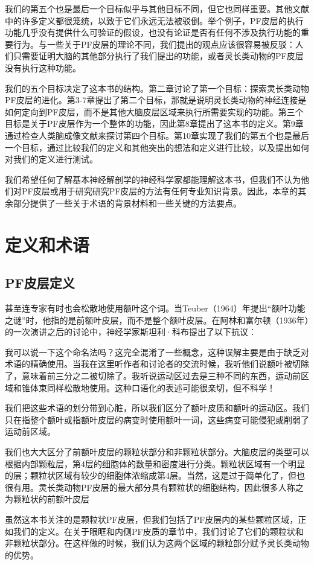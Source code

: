 我们的第五个也是最后一个目标似乎与其他目标不同，但它也同样重要。其他文献中的许多定义都很笼统，以致于它们永远无法被驳倒。举个例子，PF皮层的执行功能几乎没有提供什么可验证的假设，也没有论证是否有任何不涉及执行功能的重要行为。与一些关于PF皮层的理论不同，我们提出的观点应该很容易被反驳：人们只需要证明大脑的其他部分执行了我们提出的功能，或者灵长类动物的PF皮层没有执行这种功能。
\par
我们的五个目标决定了这本书的结构。第二章讨论了第一个目标：探索灵长类动物PF皮层的进化。第3-7章提出了第二个目标，那就是说明灵长类动物的神经连接是如何定向到PF皮层，而不是其他大脑皮层区域来执行所需要实现的功能。第三个目标是关于PF皮层作为一个整体的功能，因此第8章提出了这本书的定义。第9章通过检查人类脑成像文献来探讨第四个目标。第10章实现了我们的第五个也是最后一个目标，通过比较我们的定义和其他突出的想法和定义进行比较，以及提出如何对我们的定义进行测试。
\par
我们希望任何了解基本神经解剖学的神经科学家都能理解这本书，但我们不认为他们对PF皮层或用于研究研究PF皮层的方法有任何专业知识背景。因此，本章的其余部分提供了一些关于术语的背景材料和一些关键的方法要点。



\section{定义和术语}
\subsection{PF皮层定义}
甚至连专家有时也会松散地使用额叶这个词。当Teuber（1964）年提出“额叶功能之谜”时，他指的是前额叶皮层，而不是整个额叶皮层。在阿林和富尔顿（1936年）的一次演讲之后的讨论中，神经学家斯坦利·科布提出了以下抗议：
\par
我可以说一下这个命名法吗？这完全混淆了一些概念，这种误解主要是由于缺乏对术语的精确使用。当我在这里听作者和讨论者的交流时候，我听他们说额叶被切除了，意味着前三分之二被切除了。我听说运动区过去是三种不同的东西，运动前区域和锥体束同样松散地使用。这种口语化的表述可能很亲切，但不科学！
\par
我们把这些术语的划分带到心脏，所以我们区分了额叶皮质和额叶的运动区。我们只在指整个额叶或指额叶皮层的病变时使用额叶一词，这些病变可能侵犯或削弱了运动前区域。
\par
我们也大大区分了前额叶皮层的颗粒状部分和非颗粒状部分。大脑皮层的类型可以根据内部颗粒层，第4层的细胞体的数量和密度进行分类。颗粒状区域有一个明显的层；颗粒状区域有较少的细胞体浓缩成第4层。当然，这是过于简单化了，但也很有用。灵长类动物PF皮层的最大部分具有颗粒状的细胞结构，因此很多人称之为颗粒状的前额叶皮层 
\par
虽然这本书关注的是颗粒状PF皮层，但我们包括了PF皮层内的某些颗粒区域，正如我们的定义。在关于眼眶和内侧PF皮质的章节中，我们讨论了它们的颗粒状和非颗粒状部分。在这样做的时候，我们认为这两个区域的颗粒部分赋予灵长类动物的优势。

